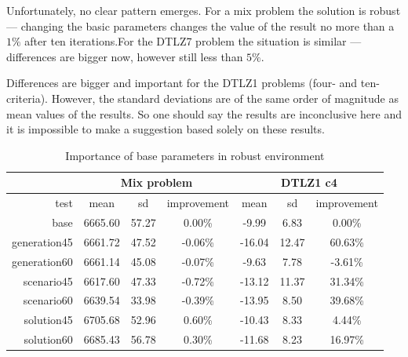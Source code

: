 Unfortunately, no clear pattern emerges. For a mix problem the solution is
robust --- changing the basic parameters changes the value of the result no
more than a $1\%$ after ten iterations.For the DTLZ7 problem the situation is
similar --- differences are bigger now, however still less than $5\%$.

Differences are bigger and important for the DTLZ1 problems (four- and
ten-criteria). However, the standard deviations are of the same order of
magnitude as mean values of the results. So one should say the results are
inconclusive here and it is impossible to make a suggestion based solely on
these results.

\begin{table}[htb]
  \centering
  \begin{tabular}{r c c c c c c}
    & \multicolumn{3}{c}{Mix problem} & \multicolumn{3}{c}{DTLZ1 c4} \\
    \hline
    test & mean & sd & improvement & mean & sd & improvement \\
    \hline
    \hline
    base & 6665.60 & 57.27 & 0.00\% & -9.99 & 6.83 & 0.00\% \\
    generation45 & 6661.72 & 47.52 & -0.06\% & -16.04 & 12.47 & 60.63\% \\
    generation60 & 6661.14 & 45.08 & -0.07\% & -9.63 & 7.78 & -3.61\% \\
    scenario45 & 6617.60 & 47.33 & -0.72\% & -13.12 & 11.37 & 31.34\% \\
    scenario60 & 6639.54 & 33.98 & -0.39\% & -13.95 & 8.50 & 39.68\% \\
    solution45 & 6705.68 & 52.96 & 0.60\% & -10.43 & 8.33 & 4.44\% \\
    solution60 & 6685.43 & 56.78 & 0.30\% & -11.68 & 8.23 & 16.97\% \\
    \hline
  \end{tabular}
  \caption{Importance of base parameters in robust environment}
  \label{t:base2_imp_1}
\end{table}

